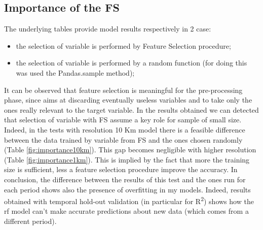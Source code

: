 \subsection{Importance of the FS}
The underlying tables provide model results respectively in 2 case:
\begin{itemize}
    \item the selection of variable is performed by Feature Selection procedure;
    \item the selection of variable is performed by a random function (for doing this was used the Pandas.sample method);
\end{itemize}
It can be observed that feature selection is meaningful for the pre-processing phase, since aims at discarding eventually useless variables and to take only the ones really relevant to the target variable. In the results obtained we can detected that selection of variable with FS assume a key role for sample of small size. 
Indeed, in the tests with resolution 10 Km model there is a feasible difference between the data trained by variable from FS and the ones chosen randomly (Table \ref{fig:importance10km}). 
This gap becomes negligible with higher resolution (Table \ref{fig:importance1km}).
This is implied by the fact that more the training size is sufficient, less a feature selection procedure improve the accuracy\cite{chu2012does}.
\newline
In conclusion, the difference between the results of this test and the ones run for each period shows also the presence of overfitting in my models. Indeed, results obtained with temporal hold-out validation (in particular for  R\textsuperscript{2}) shows how the \acrshort{rf} model can't make accurate predictions about new data (which comes from a different period).  

